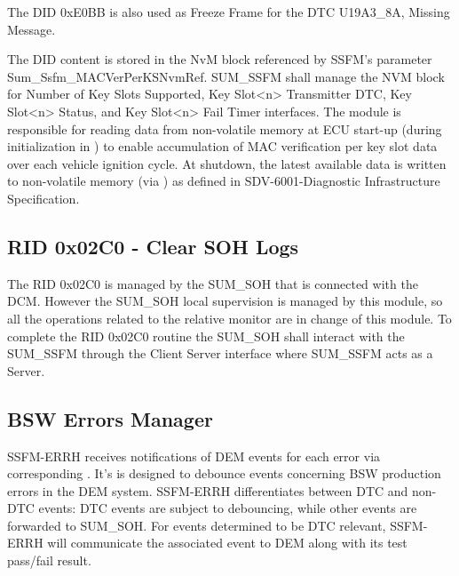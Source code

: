 The DID 0xE0BB is also used as Freeze Frame for the DTC U19A3_8A, Missing Message.
{} {} {}


The DID content is stored in the NvM block referenced by SSFM's parameter Sum_Ssfm_MACVerPerKSNvmRef.
SUM_SSFM shall manage the NVM block for Number of Key Slots Supported, Key Slot<n> Transmitter DTC, Key Slot<n> Status, and Key Slot<n> Fail Timer interfaces. 
The module is responsible for reading data from non-volatile memory at ECU start-up (during initialization in ) to enable accumulation of MAC verification per key slot data over each vehicle ignition cycle. 
At shutdown, the latest available data is written to non-volatile memory (via ) as defined in SDV-6001-Diagnostic Infrastructure Specification.


{}


\subsection{RID 0x02C0 - Clear SOH Logs}


The RID 0x02C0 is managed by the SUM\_SOH that is connected with the DCM. However the SUM_SOH local supervision is managed by this module, so all the operations
related to the relative monitor are in change of this module. To complete the RID 0x02C0 routine the SUM\_SOH shall interact with the SUM\_SSFM through the Client Server interface 
 where SUM\_SSFM acts as a Server.

{}

\subsection{BSW Errors Manager}
\label{subsec:BSW Errors Manager}

SSFM-ERRH receives notifications of DEM events for each error via corresponding . It's is designed to debounce events concerning BSW production errors in the DEM system. 
SSFM-ERRH differentiates between DTC and non-DTC events: DTC events are subject to debouncing, while other events are forwarded to SUM_SOH. 
For events determined to be DTC relevant, SSFM-ERRH will communicate the associated event to DEM along with its test pass/fail result.

